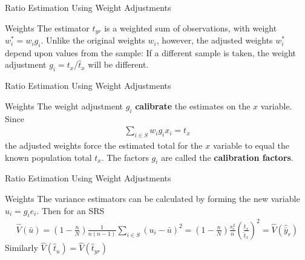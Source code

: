 \documentclass[10pt]{beamer}\usepackage[]{graphicx}\usepackage[]{xcolor}
\begin{document}
\begin{frame}{Ratio Estimation Using Weight Adjustments}
\begin{block}{Weights}
The estimator $\hat{t}_{yr}$ is a weighted sum of observations, with weight $w_i^* =w_ig_i$. Unlike the original weights $w_i$, however, the adjusted weights $w_i^*$ depend upon values from the sample: If a different sample is taken, the weight adjustment $g_i=t_x/\hat{t}_x$ will be different.
\end{block}
\end{frame}

\begin{frame}{Ratio Estimation Using Weight Adjustments}
\begin{block}{Weights}
The weight adjustment $g_i$ \textbf{calibrate} the estimates on the $x$ variable. Since
\begin{align*}
\sum_{i \in S} w_ig_i x_i = t_x
\end{align*}
the adjusted weights force the estimated total for the $x$ variable to equal the known population total $t_x$. The factors $g_i$ are called the \textbf{calibration factors}.
\end{block}
\end{frame}


\begin{frame}{Ratio Estimation Using Weight Adjustments}
\begin{block}{Weights}
The variance estimators can be calculated by forming the new variable $u_i=g_ie_i$. Then for an SRS
\begin{align*}
\hat{V}(\bar{u}) = \left( 1-\frac{n}{N}\right) \frac{1}{n(n-1)} \sum_{i\in S} (u_i -\bar{u})^2 = \left(1-\frac{n}{N}\right) \frac{s_e^2}{n} \left( \frac{t_x}{\hat{t}_x}\right)^2 = \hat{V}(\hat{\bar{y}}_r)
\end{align*}
Similarly $\hat{V}(\hat{t}_u) = \hat{V}(\hat{t}_{yr})$
\end{block}
\end{frame}
\end{document}
